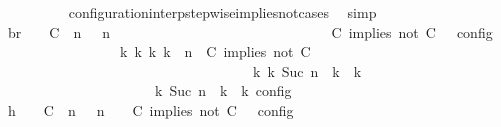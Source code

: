 \begin{isabellebody}
\ \ \ \ \ \ \ \ \isamarkupfalse%
\ configuration{\isacharunderscore}interp{\isacharunderscore}stepwise{\isacharunderscore}implies{\isacharunderscore}not{\isacharunderscore}cases\ \isamarkupfalse%
\ simp\isanewline
\ \ \ \ \ \ \isamarkupfalse%
\ \isamarkupfalse%
\ br{}{\isacharcolon}\ {\isacartoucheopen}{\isasymrho}\ {\isasymin}\ {\isasymlbrakk}\ {\isacharparenleft}{\isacharparenleft}C\ {\isasymnot}{\isasymUp}\ n{\isacharparenright}\ {\isacharhash}\ {\isasymGamma}{\isacharparenright}{\isacharcomma}\ n\isanewline
\ \ \ \ \ \ \ \ \ \ \ \ \ \ \ \ \ \ \ \ \ \ \ \ \ \ \ \ {\isasymturnstile}\ {\isasymPsi}\ {\isasymtriangleright}\ {\isacharparenleft}{\isacharparenleft}C\ implies\ not\ C\ {\isacharhash}\ {\isasymPhi}{\isacharparenright}\ {\isasymrbrakk}\isactrlsub c\isactrlsub o\isactrlsub n\isactrlsub f\isactrlsub i\isactrlsub g\isanewline
\ \ \ \ \ \ \ \ \ \ \ \ \ \ \ \ {\isasymLongrightarrow}\ {\isasymexists}{\isasymGamma}\isactrlsub k\ {\isasymPsi}\isactrlsub k\ {\isasymPhi}\isactrlsub k\ k{\isachardot}\ {\isacharparenleft}{\isacharparenleft}{\isasymGamma}{\isacharcomma}\ n\ {\isasymturnstile}\ {\isacharparenleft}{\isacharparenleft}C\ implies\ not\ C\ {\isacharhash}\ {\isasymPsi}{\isacharparenright}\ {\isasymtriangleright}\ {\isasymPhi}{\isacharparenright}\isanewline
\ \ \ \ \ \ \ \ \ \ \ \ \ \ \ \ \ \ \ \ \ \ \ \ \ \ \ \ \ \ \ \ \ \ \ \ {\isasymhookrightarrow}\isactrlbsup k\isactrlesup \ {\isacharparenleft}{\isasymGamma}\isactrlsub k{\isacharcomma}\ Suc\ n\ {\isasymturnstile}\ {\isasymPsi}\isactrlsub k\ {\isasymtriangleright}\ {\isasymPhi}\isactrlsub k{\isacharparenright}{\isacharparenright}\isanewline
\ \ \ \ \ \ \ \ \ \ \ \ \ \ \ \ \ \ {\isasymand}\ {\isasymrho}\ {\isasymin}\ {\isasymlbrakk}\ {\isasymGamma}\isactrlsub k{\isacharcomma}\ Suc\ n\ {\isasymturnstile}\ {\isasymPsi}\isactrlsub k\ {\isasymtriangleright}\ {\isasymPhi}\isactrlsub k\ {\isasymrbrakk}\isactrlsub c\isactrlsub o\isactrlsub n\isactrlsub f\isactrlsub i\isactrlsub g{\isacartoucheclose}\isanewline
\ \ \ \ \ \ \isamarkupfalse%
\ {\isacharminus}\isanewline
\ \ \ \ \ \ \ \ \isamarkupfalse%
\ h{}{\isacharcolon}\ {\isacartoucheopen}{\isasymrho}\ {\isasymin}\ {\isasymlbrakk}\ {\isacharparenleft}{\isacharparenleft}C\ {\isasymnot}{\isasymUp}\ n{\isacharparenright}\ {\isacharhash}\ {\isasymGamma}{\isacharparenright}{\isacharcomma}\ n\ {\isasymturnstile}\ {\isasymPsi}\ {\isasymtriangleright}\ {\isacharparenleft}{\isacharparenleft}C\ implies\ not\ C\ {\isacharhash}\ {\isasymPhi}{\isacharparenright}\ {\isasymrbrakk}\isactrlsub c\isactrlsub o\isactrlsub n\isactrlsub f\isactrlsub i\isactrlsub g{\isacartoucheclose}\isanewline

\end{isabellebody}
